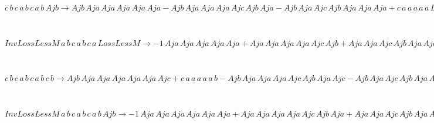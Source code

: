 \begin{minipage}{6in}
$
c\,
 b\,
 c\,
 a\,
 b\,
 c\,
 a\,
 b\,
 Ajb\rightarrow Ajb\,
 Aja\,
 Aja\,
 Aja\,
 Aja\,
 Aja - Ajb\,
 Aja\,
 Aja\,
 Aja\,
 Ajc\,
 Ajb\,
 Aja - Ajb\,
 Aja\,
 Ajc\,
 Ajb\,
 Aja\,
 Aja\,
 Aja + c\,
 a\,
 a\,
 a\,
 a\,
 a\,
 LossLessM - c\,
 a\,
 a\,
 a\,
 a\,
 b\,
 Ajb + Ajb\,
 Aja\,
 Ajc\,
 Ajb\,
 Aja\,
 Ajc\,
 Ajb\,
 Aja - c\,
 a\,
 a\,
 b\,
 c\,
 a\,
 a\,
 LossLessM + c\,
 a\,
 a\,
 b\,
 c\,
 a\,
 b\,
 Ajb - c\,
 b\,
 c\,
 a\,
 a\,
 a\,
 a\,
 LossLessM + c\,
 b\,
 c\,
 a\,
 a\,
 a\,
 b\,
 Ajb + c\,
 b\,
 c\,
 a\,
 b\,
 c\,
 a\,
 a\,
 LossLessM
$
\end{minipage}\medskip \\
\begin{minipage}{6in}
$
InvLossLessM\,
 a\,
 b\,
 c\,
 a\,
 b\,
 c\,
 a\,
 LossLessM\rightarrow -1\,
 Aja\,
 Aja\,
 Aja\,
 Aja\,
 Aja + Aja\,
 Aja\,
 Aja\,
 Aja\,
 Ajc\,
 Ajb + Aja\,
 Aja\,
 Ajc\,
 Ajb\,
 Aja\,
 Aja + Ajc\,
 Ajb\,
 Aja\,
 Aja\,
 Aja\,
 Aja - Aja\,
 Aja\,
 Ajc\,
 Ajb\,
 Aja\,
 Ajc\,
 Ajb - Ajc\,
 Ajb\,
 Aja\,
 Aja\,
 Aja\,
 Ajc\,
 Ajb - Ajc\,
 Ajb\,
 Aja\,
 Ajc\,
 Ajb\,
 Aja\,
 Aja - InvLossLessM\,
 a\,
 a\,
 a\,
 a\,
 a\,
 LossLessM + Ajc\,
 Ajb\,
 Aja\,
 Ajc\,
 Ajb\,
 Aja\,
 Ajc\,
 Ajb + InvLossLessM\,
 a\,
 a\,
 a\,
 b\,
 c\,
 a\,
 LossLessM + InvLossLessM\,
 a\,
 b\,
 c\,
 a\,
 a\,
 a\,
 LossLessM
$
\end{minipage}\medskip \\
\begin{minipage}{6in}
$
c\,
 b\,
 c\,
 a\,
 b\,
 c\,
 a\,
 b\,
 c\,
 b\rightarrow Ajb\,
 Aja\,
 Aja\,
 Aja\,
 Aja\,
 Aja\,
 Ajc + c\,
 a\,
 a\,
 a\,
 a\,
 a\,
 b - Ajb\,
 Aja\,
 Aja\,
 Aja\,
 Ajc\,
 Ajb\,
 Aja\,
 Ajc - Ajb\,
 Aja\,
 Ajc\,
 Ajb\,
 Aja\,
 Aja\,
 Aja\,
 Ajc - c\,
 a\,
 a\,
 a\,
 a\,
 b\,
 c\,
 b - c\,
 a\,
 a\,
 b\,
 c\,
 a\,
 a\,
 b - c\,
 b\,
 c\,
 a\,
 a\,
 a\,
 a\,
 b + Ajb\,
 Aja\,
 Ajc\,
 Ajb\,
 Aja\,
 Ajc\,
 Ajb\,
 Aja\,
 Ajc + c\,
 a\,
 a\,
 b\,
 c\,
 a\,
 b\,
 c\,
 b + c\,
 b\,
 c\,
 a\,
 a\,
 a\,
 b\,
 c\,
 b + c\,
 b\,
 c\,
 a\,
 b\,
 c\,
 a\,
 a\,
 b
$
\end{minipage}\medskip \\
\begin{minipage}{6in}
$
InvLossLessM\,
 a\,
 b\,
 c\,
 a\,
 b\,
 c\,
 a\,
 b\,
 Ajb\rightarrow -1\,
 Aja\,
 Aja\,
 Aja\,
 Aja\,
 Aja\,
 Aja + Aja\,
 Aja\,
 Aja\,
 Aja\,
 Ajc\,
 Ajb\,
 Aja + Aja\,
 Aja\,
 Ajc\,
 Ajb\,
 Aja\,
 Aja\,
 Aja + Ajc\,
 Ajb\,
 Aja\,
 Aja\,
 Aja\,
 Aja\,
 Aja - Aja\,
 Aja\,
 Ajc\,
 Ajb\,
 Aja\,
 Ajc\,
 Ajb\,
 Aja - Ajc\,
 Ajb\,
 Aja\,
 Aja\,
 Aja\,
 Ajc\,
 Ajb\,
 Aja - Ajc\,
 Ajb\,
 Aja\,
 Ajc\,
 Ajb\,
 Aja\,
 Aja\,
 Aja + InvLossLessM\,
 a\,
 a\,
 a\,
 a\,
 a\,
 a\,
 LossLessM - InvLossLessM\,
 a\,
 a\,
 a\,
 a\,
 a\,
 b\,
 Ajb + Ajc\,
 Ajb\,
 Aja\,
 Ajc\,
 Ajb\,
 Aja\,
 Ajc\,
 Ajb\,
 Aja - InvLossLessM\,
 a\,
 a\,
 a\,
 b\,
 c\,
 a\,
 a\,
 LossLessM + InvLossLessM\,
 a\,
 a\,
 a\,
 b\,
 c\,
 a\,
 b\,
 Ajb - InvLossLessM\,
 a\,
 b\,
 c\,
 a\,
 a\,
 a\,
 a\,
 LossLessM + InvLossLessM\,
 a\,
 b\,
 c\,
 a\,
 a\,
 a\,
 b\,
 Ajb + InvLossLessM\,
 a\,
 b\,
 c\,
 a\,
 b\,
 c\,
 a\,
 a\,
 LossLessM
$
\end{minipage}\medskip \\
